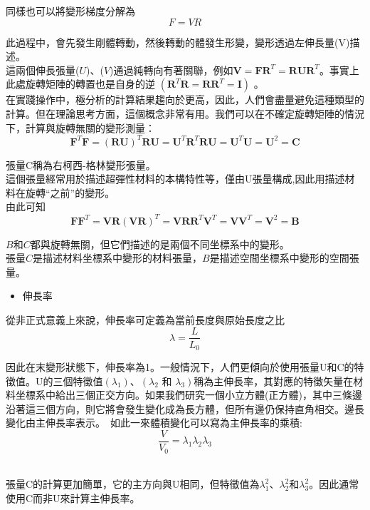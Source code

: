 同樣也可以將變形梯度分解為\
$$F=V R$$

此過程中，會先發生剛體轉動，然後轉動的體發生形變，變形透過左伸長量(V)描述。\\

這兩個伸長張量($U$)、($V$)通過純轉向有著關聯，例如$\mathbf{V}=\mathbf{F R}^T=\mathbf{R} \mathbf{U} \mathbf{R}^T$。事實上此處旋轉矩陣的轉置也是自身的逆 $\left(\mathbf{R}^T \mathbf{R}=\mathbf{R R}^T=\mathbf{I}\right)$ 。\\

在實踐操作中，極分析的計算結果趨向於更高，因此，人們會盡量避免這種類型的計算。但在理論思考方面，這個概念非常有用。我們可以在不確定旋轉矩陣的情況下，計算與旋轉無關的變形測量：\
$$\mathbf{F}^T \mathbf{F}=(\mathbf{R U})^T \mathbf{R} \mathbf{U}=\mathbf{U}^T \mathbf{R}^T \mathbf{R} \mathbf{U}=\mathbf{U}^T \mathbf{U}=\mathbf{U}^2=\mathbf{C}$$

張量C稱為右柯西-格林變形張量。\\

這個張量經常用於描述超彈性材料的本構特性等，僅由U張量構成,因此用描述材料在旋轉“之前”的變形。\\

由此可知\
$$\mathbf{F} \mathbf{F}^T=\mathbf{V R}(\mathbf{V R})^T=\mathbf{V R R}^T \mathbf{V}^T=\mathbf{V} \mathbf{V}^T=\mathbf{V}^2=\mathbf{B}$$

$B$和$C$都與旋轉無關，但它們描述的是兩個不同坐標系中的變形。\\

張量$C$是描述材料坐標系中變形的材料張量，$B$是描述空間坐標系中變形的空間張量。\\

\begin{itemize}
\item 伸長率
\end{itemize}
從非正式意義上來說，伸長率可定義為當前長度與原始長度之比\
$$\lambda=\frac{L}{L_0}$$

因此在末變形狀態下，伸長率為1。一般情況下，人們更傾向於使用張量U和C的特徵值。U的三個特徵值$\left(\lambda_1\right)$、$\left(\lambda_2\right.$ 和 $\left.\lambda_3\right)$稱為主伸長率，其對應的特徵矢量在材料坐標系中給出三個正交方向。如果我們研究一個小立方體(正方體)，其中三條邊沿著這三個方向，則它將會發生變化成為長方體，但所有邊仍保持直角相交。邊長變化由主伸長率表示。\
如此一來體積變化可以寫為主伸長率的乘積:\
$$\frac{V}{V_0}=\lambda_1 \lambda_2 \lambda_3$$\

張量C的計算更加簡單，它的主方向與U相同，但特徵值為$\lambda_1^2$、$\lambda_2^2$和$\lambda_3^2$。因此通常使用C而非U來計算主伸長率。\\

